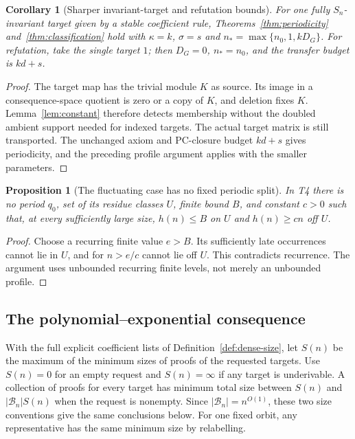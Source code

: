 \documentclass[11pt,a4paper]{article}
\newtheorem{proposition}[theorem]{Proposition}
\newtheorem{corollary}[theorem]{Corollary}
\theoremstyle{definition}\newtheorem{definition}[theorem]{Definition}
\theoremstyle{remark}\newtheorem{remark}[theorem]{Remark}
\begin{document}
\begin{corollary}[Sharper invariant-target and refutation bounds]\label{cor:invariant-budget}
For one fully $S_n$-invariant target given by a stable coefficient rule,
Theorems~\ref{thm:periodicity} and~\ref{thm:classification} hold with
$\kappa=k$, $\sigma=s$ and
$n_*=\max\{n_0,1,kD_G\}$. For refutation, take the single target $1$;
then $D_G=0$, $n_*=n_0$, and the transfer budget is $kd+s$.
\end{corollary}
\begin{proof}
The target map has the trivial module $K$ as source. Its image in a
consequence-space quotient is zero or a copy of $K$, and deletion fixes
$K$. Lemma~\ref{lem:constant} therefore detects membership without the
doubled ambient support needed for indexed targets. The actual target
matrix is still transported. The unchanged axiom and PC-closure budget
$kd+s$ gives periodicity, and the preceding profile argument applies
with the smaller parameters.
\end{proof}

\begin{proposition}[The fluctuating case has no fixed periodic split]\label{prop:no-periodic-split}
In T4 there is no period $q_0$, set of its residue classes $U$, finite
bound $B$, and constant $c>0$ such that, at every sufficiently large
size, $h(n)\le B$ on $U$ and $h(n)\ge cn$ off $U$.
\end{proposition}
\begin{proof}
Choose a recurring finite value $e>B$. Its sufficiently late occurrences
cannot lie in $U$, and for $n>e/c$ cannot lie off $U$. This contradicts
recurrence. The argument uses unbounded recurring finite levels, not
merely an unbounded profile.
\end{proof}

\subsection{The polynomial--exponential consequence}\label{sec:dense-types}
With the full explicit coefficient lists of
Definition~\ref{def:dense-size}, let $S(n)$ be the maximum of the minimum
sizes of proofs of the requested targets. Use $S(n)=0$ for an empty
request and $S(n)=\infty$ if any target is underivable. A collection of
proofs for every target has minimum total size between $S(n)$ and
$|\mathcal B_n|S(n)$ when the request is nonempty. Since
$|\mathcal B_n|=n^{O(1)}$, these two size conventions give the same
conclusions below. For one fixed orbit, any representative has the same
minimum size by relabelling.
\end{document}
